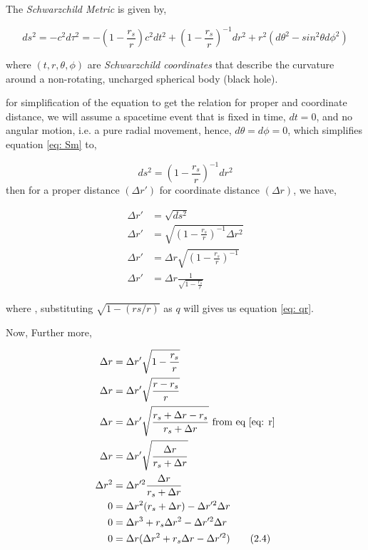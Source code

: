 \documentclass[9pt,a4paper,twocolumn,twoside]{tau-class/tau}
\begin{document}
  The \emph{Schwarzchild Metric} is given by, 

  \begin{equation} \label{eq: Sm}
    ds^2 = -c^2d\tau^2 = -(1 - \frac{r_s}{r}) c^2 dt^2 + (1 - \frac{r_s}{r})^{-1} dr^2 + r^2 (d\theta^2 - sin^2\theta d\phi^2) \tag{2.1}
  \end{equation}

  where \((t, r, \theta, \phi)\) are \emph{Schwarzchild coordinates} that describe the curvature around a non-rotating, uncharged spherical body (black hole). 
  
  for simplification of the equation to get the relation for proper and coordinate distance, we will assume a spacetime event that is fixed in time, \(dt = 0\), and no angular motion, i.e. a pure radial movement, hence, \(d\theta = d\phi = 0\), which simplifies equation \eqref{eq: Sm} to, 

  \begin{equation} \label{eq: 2.2}
    ds^2 = (1 - \frac{r_s}{r})^{-1} dr^2 \tag{2.2}
  \end{equation}
  then for a proper distance \((\Delta r')\) for coordinate distance \((\Delta r)\), we have, 
  
  \begin{align*} \label{eq:2.3}
    \Delta r' &= \sqrt{ds^2}  \\
    \Delta r' &= \sqrt{(1- \frac{r_s}{r})^{-1} \Delta r^2}  \\
    \Delta r' &= \Delta r \sqrt{(1 - \frac{r_s}{r})^{-1}} \\
    \Delta r' &= \Delta r \frac{1}{\sqrt{1- \frac{r_s}{r}}} \tag{2.3} 
  \end{align*}

  where , substituting \(\sqrt{1 - (rs/r)}\) as \(q\) will gives us equation \eqref{eq: qr}. 

  Now, Further more, 

  \begin{align*} \label{eq: 2.4}
    \Delta r &= \Delta r' \sqrt{1- \frac{r_s}{r}} \\
    \Delta r &= \Delta r' \sqrt{\frac{r - r_s}{r}} \\
    \Delta r &= \Delta r' \sqrt{\frac{r_s + \Delta r - r_s}{ r_s + \Delta r}} \text{    from eq \eqref{eq: r}} \\
    \Delta r &= \Delta r' \sqrt{\frac{ \Delta r }{ r_s + \Delta r}} \\
    \Delta r^2 &= \Delta r'^2 \frac{\Delta r }{ r_s + \Delta r} \\
    0 &= \Delta r^2 (r_s + \Delta r) - \Delta r'^{2} \Delta r \\
    0 &= \Delta r^3 + r_s\Delta r^2 - \Delta r'^{2} \Delta r \\
    0 &= \Delta r(\Delta r^2 + r_s\Delta r - \Delta r'^{2})  \tag{2.4}
  \end{align*}
  
\end{document}
